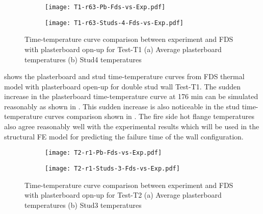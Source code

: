 \begin{figure}[!htbp]
	\centering
	\begin{subfigure}[b]{0.6\textwidth}
		\centering
		\texttt{[image: T1-r63-Pb-Fds-vs-Exp.pdf]}
		\caption{}
		\label{subfig:T1-r63-Pb-Fds-vs-Exp}
	\end{subfigure}
	\begin{subfigure}[b]{0.6\textwidth}
		\centering
		\texttt{[image: T1-r63-Studs-4-Fds-vs-Exp.pdf]}
		\caption{}
		\label{subfig:T1-r63-Studs-4-Fds-vs-Exp}
	\end{subfigure}
	   \caption{Time-temperature curve comparison between experiment and FDS with plasterboard opn-up for Test-T1 (a) Average plasterboard temperatures (b) Stud4 temperatures}
	   \label{fig:T1-fds-output-pbop}
\end{figure}

 shows the plasterboard and stud time-temperature curves from FDS thermal model with plasterboard open-up for double stud wall Test-T1. The sudden increase in the plasterboard time-temperature curve at 176 min can be simulated reasonably as shown in . This sudden increase is also noticeable in the stud time-temperature curves comparison shown in . The fire side hot flange temperatures also agree reasonably well with the experimental results which will be used in the structural FE model for predicting the failure time of the wall configuration.

\begin{figure}[!htbp]
	\centering
	\begin{subfigure}[b]{0.6\textwidth}
		\centering
		\texttt{[image: T2-r1-Pb-Fds-vs-Exp.pdf]}
		\caption{}
		\label{subfig:T2-r1-Pb-Fds-vs-Exp}
	\end{subfigure}
	\begin{subfigure}[b]{0.6\textwidth}
		\centering
		\texttt{[image: T2-r1-Studs-3-Fds-vs-Exp.pdf]}
		\caption{}
		\label{subfig:T2-r1-Studs-3-Fds-vs-Exp}
	\end{subfigure}
	   \caption{Time-temperature curve comparison between experiment and FDS with plasterboard opn-up for Test-T2 (a) Average plasterboard temperatures (b) Stud3 temperatures}
	   \label{fig:T2-fds-output-pbop}
\end{figure}

